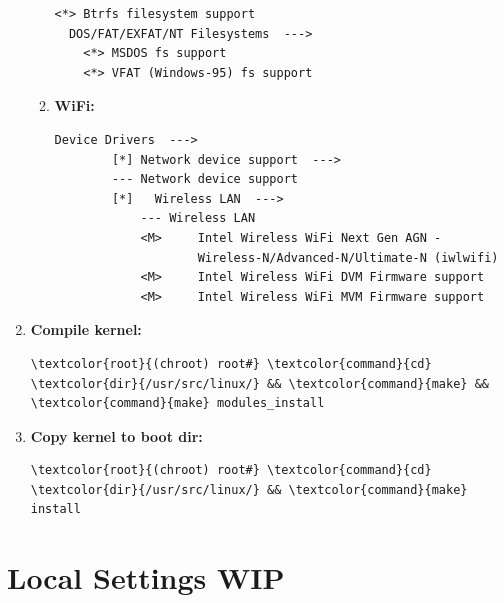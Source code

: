 \documentclass[10pt, a4paper, onecolumn, oneside, titlepage, openany]{book}
\begin{document}
\begin{enumerate}
\begin{enumerate}
\begin{Verbatim}[commandchars=\\\{\}]
  <*> Btrfs filesystem support
  DOS/FAT/EXFAT/NT Filesystems  --->
    <*> MSDOS fs support
    <*> VFAT (Windows-95) fs support
\end{Verbatim}
        \item \textbf{WiFi:}
\begin{Verbatim}[commandchars=\\\{\}]
Device Drivers  --->
        [*] Network device support  --->
        --- Network device support
        [*]   Wireless LAN  --->
            --- Wireless LAN
            <M>     Intel Wireless WiFi Next Gen AGN -
                    Wireless-N/Advanced-N/Ultimate-N (iwlwifi)
            <M>     Intel Wireless WiFi DVM Firmware support
            <M>     Intel Wireless WiFi MVM Firmware support
\end{Verbatim}
    \end{enumerate}
    \item \textbf{Compile kernel:}
\begin{Verbatim}[commandchars=\\\{\}]
\textcolor{root}{(chroot) root#} \textcolor{command}{cd} \textcolor{dir}{/usr/src/linux/} && \textcolor{command}{make} && \textcolor{command}{make} modules_install
\end{Verbatim}
    \item \textbf{Copy kernel to boot dir:}
\begin{Verbatim}[commandchars=\\\{\}]
\textcolor{root}{(chroot) root#} \textcolor{command}{cd} \textcolor{dir}{/usr/src/linux/} && \textcolor{command}{make} install
\end{Verbatim}
\end{enumerate}


\chapter{Local Settings WIP}
\label{section:local_settings}
\end{document}
